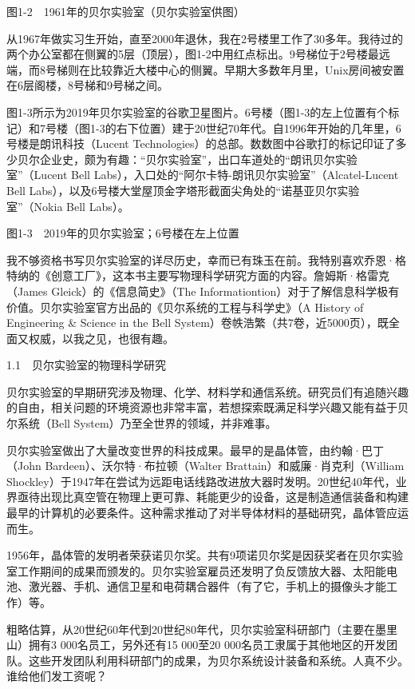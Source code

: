 \documentclass[a4paper,12pt,UTF8,twoside]{ctexbook}
\begin{document}
图1-2　1961年的贝尔实验室（贝尔实验室供图）

从1967年做实习生开始，直至2000年退休，我在2号楼里工作了30多年。我待过的两个办公室都在侧翼的5层（顶层），图1-2中用红点标出。9号梯位于2号楼最远端，而8号梯则在比较靠近大楼中心的侧翼。早期大多数年月里，Unix房间被安置在6层阁楼，8号梯和9号梯之间。

图1-3所示为2019年贝尔实验室的谷歌卫星图片。6号楼（图1-3的左上位置有个标记）和7号楼（图1-3的右下位置）建于20世纪70年代。自1996年开始的几年里，6号楼是朗讯科技（Lucent Technologies）的总部。数数图中谷歌打的标记印证了多少贝尔企业史，颇为有趣：“贝尔实验室”，出口车道处的“朗讯贝尔实验室”（Lucent Bell Labs），入口处的“阿尔卡特-朗讯贝尔实验室”（Alcatel-Lucent Bell Labs），以及6号楼大堂屋顶金字塔形截面尖角处的“诺基亚贝尔实验室”（Nokia Bell Labs）。



图1-3　2019年的贝尔实验室；6号楼在左上位置

我不够资格书写贝尔实验室的详尽历史，幸而已有珠玉在前。我特别喜欢乔恩·格特纳的《创意工厂》，这本书主要写物理科学研究方面的内容。詹姆斯·格雷克（James Gleick）的《信息简史》（The Informationtion）对于了解信息科学极有价值。贝尔实验室官方出品的《贝尔系统的工程与科学史》（A History of Engineering \& Science in the Bell System）卷帙浩繁（共7卷，近5000页），既全面又权威，以我之见，也很有趣。





1.1　贝尔实验室的物理科学研究


贝尔实验室的早期研究涉及物理、化学、材料学和通信系统。研究员们有追随兴趣的自由，相关问题的环境资源也非常丰富，若想探索既满足科学兴趣又能有益于贝尔系统（Bell System）乃至全世界的领域，并非难事。

贝尔实验室做出了大量改变世界的科技成果。最早的是晶体管，由约翰·巴丁（John Bardeen）、沃尔特·布拉顿（Walter Brattain）和威廉·肖克利（William Shockley）于1947年在尝试为远距电话线路改进放大器时发明。20世纪40年代，业界亟待出现比真空管在物理上更可靠、耗能更少的设备，这是制造通信装备和构建最早的计算机的必要条件。这种需求推动了对半导体材料的基础研究，晶体管应运而生。

1956年，晶体管的发明者荣获诺贝尔奖。共有9项诺贝尔奖是因获奖者在贝尔实验室工作期间的成果而颁发的。贝尔实验室雇员还发明了负反馈放大器、太阳能电池、激光器、手机、通信卫星和电荷耦合器件（有了它，手机上的摄像头才能工作）等。

粗略估算，从20世纪60年代到20世纪80年代，贝尔实验室科研部门（主要在墨里山）拥有3 000名员工，另外还有15 000至20 000名员工隶属于其他地区的开发团队。这些开发团队利用科研部门的成果，为贝尔系统设计装备和系统。人真不少。谁给他们发工资呢？
\end{document}
